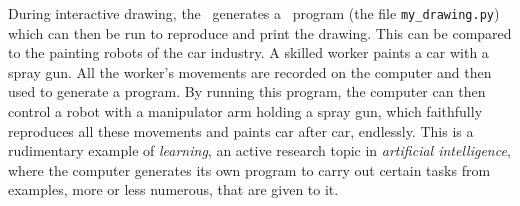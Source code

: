 {\begin{minipage}{\myparboxwidth}
During interactive drawing, the \robot\ generates a \python\ program
(the file {\tt my\_drawing.py})
which can then be run
to reproduce and print the drawing. This can be compared to the painting robots
of the car industry. A skilled worker paints a
car with a spray gun. All the worker's movements are recorded on
the computer and then used to generate a program. By running this
program, the computer can then control a robot with a manipulator
arm holding a spray gun, which faithfully reproduces all these
movements and paints car after car, endlessly. This is a rudimentary example
of {\em learning}, an active research topic in {\em artificial
intelligence}, where the computer generates its own
program to carry out certain tasks from examples, more or less numerous,
that are given to it.

\vspace{\abovedisplayskip}
\end{minipage}
}

\noindent {}
